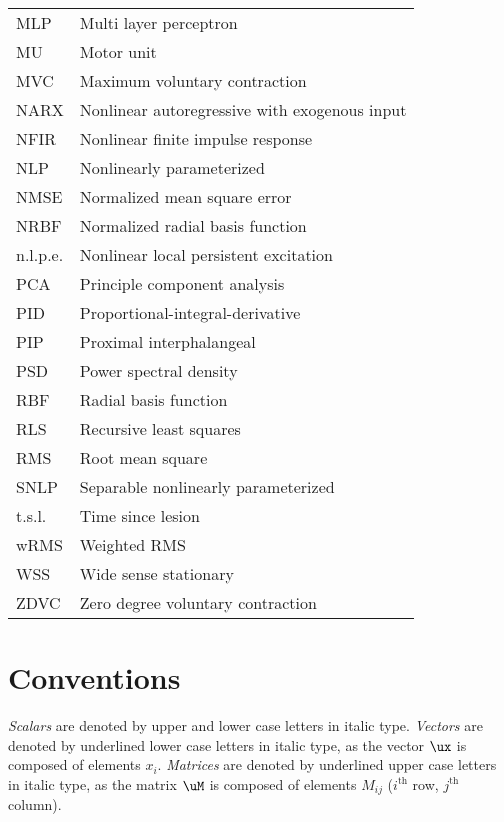 \begin{longtable}[l]{ll}
MLP				& Multi layer perceptron\\
MU				& Motor unit\\
MVC				& Maximum voluntary contraction\\
NARX      & Nonlinear autoregressive with exogenous input\\
NFIR			& Nonlinear finite impulse response\\
NLP				& Nonlinearly parameterized\\
NMSE			& Normalized mean square error\\
NRBF			& Normalized radial basis function\\
n.l.p.e.  & Nonlinear local persistent excitation\\
PCA				& Principle component analysis\\
PID				& Proportional-integral-derivative\\
PIP				& Proximal interphalangeal\\
PSD				& Power spectral density\\
RBF				& Radial basis function\\
RLS				& Recursive least squares\\
RMS       & Root mean square\\
SNLP			& Separable nonlinearly parameterized\\
t.s.l.		& Time since lesion\\
wRMS			& Weighted RMS\\
WSS				& Wide sense stationary\\
ZDVC			& Zero degree voluntary contraction\\
\end{longtable}

\vspace{0.5cm}
\section*{Conventions}


\emph{Scalars} are denoted by upper and lower case letters in italic
type. \emph{Vectors} are denoted by underlined lower case letters in italic type, as the vector $\ux$ is composed of elements $x_i$. \emph{Matrices} are denoted by underlined upper case letters in italic type, as the matrix $\uM$ is composed of elements $M_{ij}$ ($i^{\text{th}}$ row, $j^{\text{th}}$ column).

